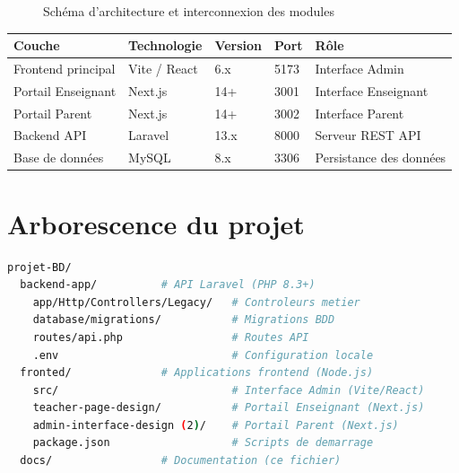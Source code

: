 \documentclass[12pt,a4paper]{report}
\begin{document}
\begin{figure}[H]
    \caption{Schéma d'architecture et interconnexion des modules}
\end{figure}

\begin{center}
\begin{tabular}{lllll}\toprule
\textbf{Couche} & \textbf{Technologie} & \textbf{Version} & \textbf{Port} & \textbf{Rôle} \\\midrule
Frontend principal & Vite / React & 6.x & 5173 & Interface Admin \\
Portail Enseignant & Next.js & 14+ & 3001 & Interface Enseignant \\
Portail Parent    & Next.js & 14+ & 3002 & Interface Parent \\
Backend API       & Laravel & 13.x & 8000 & Serveur REST API \\
Base de données   & MySQL & 8.x & 3306 & Persistance des données \\
\bottomrule\end{tabular}
\end{center}

\section{Arborescence du projet}

\begin{lstlisting}[language=bash]
projet-BD/
  backend-app/          # API Laravel (PHP 8.3+)
    app/Http/Controllers/Legacy/   # Controleurs metier
    database/migrations/           # Migrations BDD
    routes/api.php                 # Routes API
    .env                           # Configuration locale
  fronted/              # Applications frontend (Node.js)
    src/                           # Interface Admin (Vite/React)
    teacher-page-design/           # Portail Enseignant (Next.js)
    admin-interface-design (2)/    # Portail Parent (Next.js)
    package.json                   # Scripts de demarrage
  docs/                 # Documentation (ce fichier)
\end{lstlisting}
\end{document}
